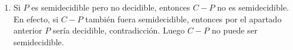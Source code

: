 \documentclass[12pt]{article}
\begin{document}
\begin{ejercicio}[1.3 puntos]
\begin{enumerate}
            Para decidir $P$ sobre una entrada $x$, ejecutamos en paralelo $M_1(x)$ y $M_2(x)$. Si $M_1$ acepta, respondemos SI. Si $M_2$ acepta, respondemos NO. Como toda entrada $x$ pertenece a $L(P)$ o a $\overline{L(P)}$, una de las dos máquinas aceptará en tiempo finito. Por tanto, este procedimiento siempre termina y decide $P$.

            \item Si $P$ es semidecidible pero no decidible, entonces $C-P$ no es semidecidible. \\

            En efecto, si $C-P$ también fuera semidecidible, entonces por el apartado anterior $P$ sería decidible, contradicción. 
            Luego $C-P$ no puede ser semidecidible.
        \end{enumerate}
    \end{ejercicio}

    \newpage
\end{document}
